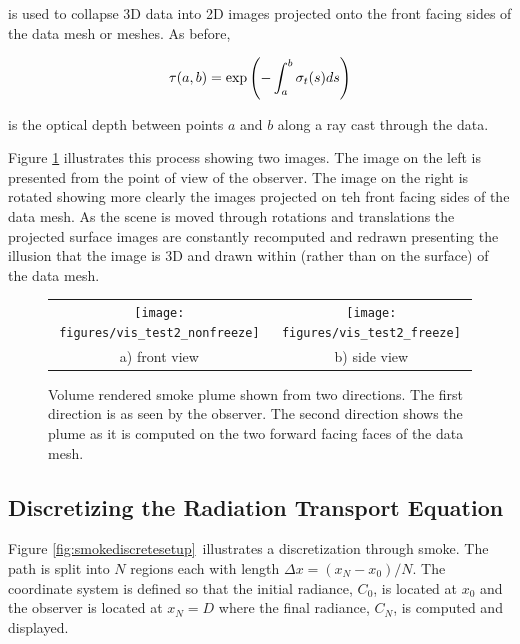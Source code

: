 is used to collapse 3D data into 2D images projected onto the front facing sides of the data mesh or meshes. As before,

\begin{equation}
\label{eq:optdepth}
\tau(a,b)=\exp\left({-\int_a^b \sigma_t(s) ds}\right)
\end{equation}

is the optical depth between points $a$ and $b$ along a ray cast through the data.

Figure \ref{fig:volplume_example} illustrates this process showing two images.
The image on the left is presented from the point of view of the observer.  The image on the right is rotated showing more clearly the images projected on teh front facing sides of the data mesh.  As the scene is moved through rotations and translations the projected surface images are constantly recomputed and redrawn presenting the illusion that the image is 3D and drawn within (rather than on the surface) of the data mesh.

\begin{figure}[\figoptions]
\begin{center}
\begin{tabular}{cc}
\texttt{[image: figures/vis\_test2\_nonfreeze]}&
\texttt{[image: figures/vis\_test2\_freeze]}\\
a) front view&b) side view\\
\end{tabular}
\end{center}
\caption[Volume rendered smoke plume shown from two directions.]{Volume rendered smoke plume shown from two directions.
The first direction is as seen by the observer.  The second direction shows
the plume as it is computed on the two forward facing faces of the data mesh.
}
\label{fig:volplume_example}
\end{figure}

\subsection{Discretizing the Radiation Transport Equation}
\newcommand{\htau}[1]{\tau_{#1}^{N-1}}
\newcommand{\sigai}[1]{\sigma_{a,#1}}
\newcommand{\Lei}[1]{C_{e,#1}}
\newcommand{\Lhatj}[1]{C_{#1}^N}
\newcommand{\Lhatjj}[1]{\hat{C}_{#1}^N}
\newcommand{\Chatjj}[1]{\hat{C}_{#1}^N}
\newcommand{\Leii}[1]{\hat{C}_{e,#1}}


Figure \ref{fig:smokediscretesetup}\ illustrates a discretization through  smoke.  The path is split into $N$ regions each with length $\Delta x=(x_N-x_0)/N$.  The coordinate system is defined so that the initial radiance, $C_0$, is located at $x_0$ and the observer is located at $x_N=D$  where the final radiance, $C_N$, is computed and displayed.

